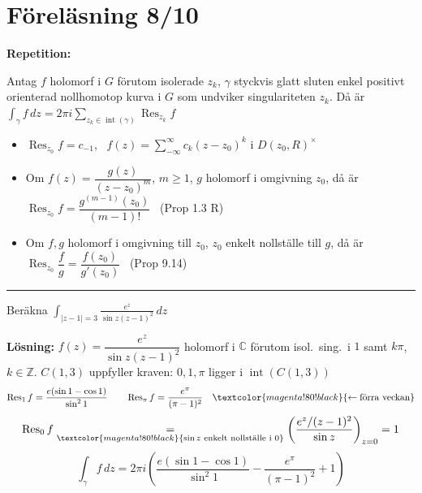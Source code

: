 \section{Föreläsning 8/10}
\textbf{Repetition:}

\begin{theorem}[Residysatsen]
Antag $f$ holomorf i $G$ förutom isolerade $z_k$, $\gamma$ styckvis glatt sluten enkel positivt orienterad nollhomotop kurva i $G$ som undviker singulariteten $z_k$.
Då är $\displaystyle\int_\gamma f\,dz = 2\pi i \sum_{z_k \in \operatorname{int}(\gamma)} \operatorname{Res}_{z_k} f$
\end{theorem}
\begin{itemize}
  \item $\operatorname{Res}_{z_0} f = c_{-1}$, \ $f(z) = \sum_{-\infty}^\infty c_k(z - z_0)^k$ i $D(z_0, R)^\times$
  \item Om $f(z) = \dfrac{g(z)}{(z - z_0)^m}$, $m \ge 1$, $g$ holomorf i omgivning $z_0$, då är $\operatorname{Res}_{z_0} f = \dfrac{g^{(m-1)}(z_0)}{(m - 1)!}$ \ \textcolor{blue!60!black}{(Prop 1.3 R)}
  \item Om $f, g$ holomorf i omgivning till $z_0$, $z_0$ enkelt nollställe till $g$, då är $\operatorname{Res}_{z_0} \dfrac{f}{g} = \dfrac{f(z_0)}{g'(z_0)}$ \ \textcolor{blue!60!black}{(Prop 9.14)}
\end{itemize}

\noindent\rule{\linewidth}{0.4pt}

\begin{example}
Beräkna $\displaystyle\int_{|z - 1| = 3} \frac{e^z}{\sin z(z - 1)^2}\,dz$

\textbf{Lösning:} $f(z) = \dfrac{e^z}{\sin z(z - 1)^2}$ holomorf i $\mathbb{C}$ förutom isol.\ sing.\ i $1$ samt $k\pi$, $k \in \mathbb{Z}$. $C(1, 3)$ uppfyller kraven:
$0, 1, \pi$ ligger i $\operatorname{int}(C(1, 3))$
\[ \operatorname{Res}_1 f = \frac{e(\sin 1 - \cos 1)}{\sin^2 1} \qquad \operatorname{Res}_\pi f = \frac{e^\pi}{(\pi - 1)^2} \quad \textcolor{magenta!80!black}{\leftarrow \text{förra veckan}} \]
\[ \operatorname{Res}_0 f \underset{\textcolor{magenta!80!black}{\sin z \text{ enkelt nollställe i } 0}}{=} \left( \frac{e^z/(z - 1)^2}{\sin z} \right)_{z = 0} = 1 \]
\[ \int_\gamma f\,dz = 2\pi i\left( \frac{e(\sin 1 - \cos 1)}{\sin^2 1} - \frac{e^\pi}{(\pi - 1)^2} + 1 \right) \]
\end{example}

